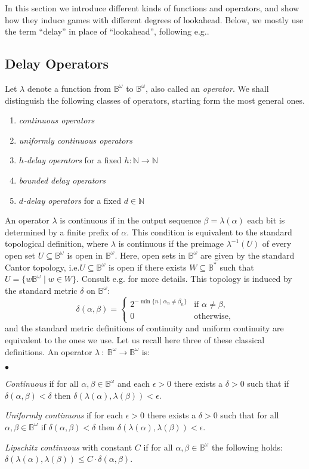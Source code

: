 \documentclass[fleqn,envcountsame]{LMCS}
\newcommand{\Nat}{\ensuremath{\mathbb{N}}\xspace}
\newcommand{\Bst}{\ensuremath{\mathbb{B}^*}\xspace}
\newcommand{\Bom}{\ensuremath{\mathbb{B}^{\omega}}\xspace}
\newcommand{\al}{\ensuremath{\alpha}\xspace}
\newcommand{\be}{\ensuremath{\beta}\xspace}
\newcommand{\ie}{i.e.\xspace}
\newcommand{\eg}{e.g.\xspace}
\begin{document}
In this section we introduce different kinds of functions and operators,
and show how they induce games with different degrees of lookahead.
Below, we mostly use the term ``delay'' in place of ``lookahead'',
following \eg \cite{HL72FinDelSol}.



\subsection{Delay Operators}\label{subsec:delay_operators}

Let $\lambda$ denote a function from \Bom to \Bom, also called
an \emph{operator}. We shall distinguish the following classes of operators,
starting form the most general ones.
\begin{enumerate}[(1)]
\item \emph{continuous operators}
\item \emph{uniformly continuous operators}
\item \emph{$h$-delay operators} for a fixed $h:\Nat\to\Nat$
\item \emph{bounded delay operators}
\item \emph{$d$-delay operators} for a fixed $d\in\Nat$
\end{enumerate}

An operator $\lambda$ is continuous if in the output sequence
$\beta = \lambda(\al)$ each bit is determined by a finite prefix of $\al$. 
This condition is equivalent to the standard topological definition,
where $\lambda$ is continuous if the preimage $\lambda^{-1}(U)$ of every open set
$U\subseteq\Bom$ is open in \Bom. Here, open sets in \Bom are given by
the standard Cantor topology, \ie $U\subseteq\Bom$ is open if there exists
$W \subseteq \Bst$ such that $U = \{w\Bom\mid w\in W\}$.
Consult \eg \cite{TL93LogSpecInfComp} for more details.
This topology is induced by the standard metric $\delta$ on \Bom:
\[ \delta(\al,\be) = \begin{cases}
  2^{-\min\{n\mid\al_n\neq\be_n\}} & \text{if }\al\neq\be,\\
  0 & \text{otherwise},
\end{cases} \]
and the standard metric definitions of continuity and uniform continuity
are equivalent to the ones we use. Let us recall here three of these classical
definitions. An operator $\lambda \ :\ \Bom \to \Bom$ is: 
\begin{iteMize}{$\bullet$}
\item \emph{Continuous} if for all $\al,\be\in\Bom$ and each $\epsilon > 0$
  there exists a $\delta > 0$ such that if $\delta(\al,\be) < \delta$ then 
  $\delta(\lambda(\al),\lambda(\be)) < \epsilon$.
\item \emph{Uniformly continuous} if for each $\epsilon > 0$
  there exists a $\delta > 0$ such that for all $\al,\be\in\Bom$
  if $\delta(\al,\be) < \delta$ then 
  $\delta(\lambda(\al),\lambda(\be)) < \epsilon$.
\item \emph{Lipschitz continuous} with constant $C$ if
  for all $\al,\be\in\Bom$ the following holds:
  $\delta(\lambda(\al),\lambda(\be)) \leq C\cdot\delta(\al,\be)$.
\end{iteMize}
\end{document}
